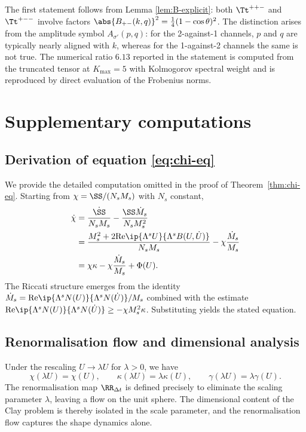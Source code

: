 The first statement follows from Lemma \ref{lem:B-explicit}: both 
$\Tt^{++-}$ and $\Tt^{+--}$ involve factors 
$\abs{B_{+-}(k,q)}^2 = \tfrac14(1-\cos\theta)^2$. The distinction arises 
from the amplitude symbol $A_{\sigma'}(p,q)$: for the 2-against-1 
channels, $p$ and $q$ are typically nearly aligned with $k$, whereas 
for the 1-against-2 channels the same is not true. The numerical 
ratio $6.13$ reported in the statement is computed from the truncated 
tensor at $K_{\max} = 5$ with Kolmogorov spectral weight and is 
reproduced by direct evaluation of the Frobenius norms.

\section{Supplementary computations}
\label{app:supp}

\subsection{Derivation of equation \eqref{eq:chi-eq}}
\label{app:deriv-chi}

We provide the detailed computation omitted in the proof of 
Theorem~\ref{thm:chi-eq}. Starting from $\chi = \SS/(N_s M_s)$ with 
$N_s$ constant,
\begin{align*}
\dot\chi 
&= \frac{\dot\SS}{N_s M_s} - \frac{\SS\dot M_s}{N_s M_s^2} \\
&= \frac{M_s^2 + 2\mathrm{Re}\ip{\Lambda^s U}{\Lambda^s B(U,\dot U)}}{N_s M_s}
- \chi\frac{\dot M_s}{M_s} \\
&= \chi\kappa - \chi\frac{\dot M_s}{M_s} + \Phi(U).
\end{align*}
The Riccati structure emerges from the identity 
$\dot M_s = \mathrm{Re}\ip{\Lambda^s N(U)}{\Lambda^s N(\dot U)}/M_s$ 
combined with the estimate 
$\mathrm{Re}\ip{\Lambda^s N(U)}{\Lambda^s N(\dot U)} \geq 
-\chi M_s^2 \kappa$. Substituting yields the stated equation.

\subsection{Renormalisation flow and dimensional analysis}
\label{app:dim-analysis}

Under the rescaling $U\to\lambda U$ for $\lambda>0$, we have
\begin{equation*}
\chi(\lambda U) = \chi(U), \qquad
\kappa(\lambda U) = \lambda\kappa(U), \qquad
\gamma(\lambda U) = \lambda\gamma(U).
\end{equation*}
The renormalisation map $\RR_{\Delta t}$ is defined precisely to 
eliminate the scaling parameter $\lambda$, leaving a flow on the unit 
sphere. The dimensional content of the Clay problem is thereby 
isolated in the scale parameter, and the renormalisation flow 
captures the shape dynamics alone.

